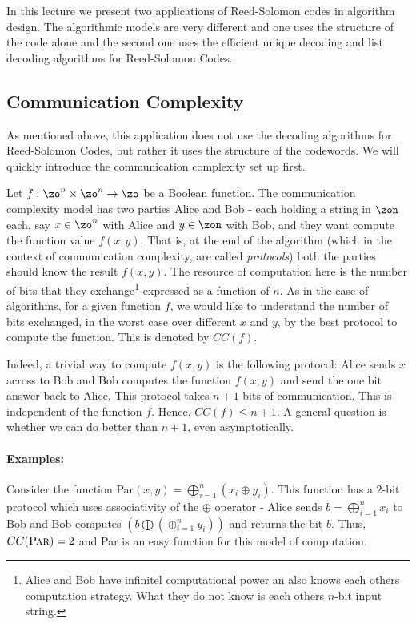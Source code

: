 In this lecture we present two applications of Reed-Solomon codes in algorithm design. The algorithmic models are very different and one uses the structure of the code alone and the second one uses the efficient unique decoding and list decoding algorithms for Reed-Solomon Codes.

\subsection{Communication Complexity}
As mentioned above, this application does not use the decoding algorithms for Reed-Solomon Codes, but rather it uses the  structure of the codewords. We will quickly introduce the communication complexity set up first.

Let $f : \zo^n \times \zo^n \to \zo$ be a Boolean function. The communication complexity model has two parties Alice and Bob - each holding a string in $\zon$ each, say $x \in \zo^n$ with Alice and $y \in \zon$ with Bob, and they want compute the function value $f(x,y)$. That is, at the end of the algorithm (which in the context of communication complexity, are called {\em protocols}) both the parties should know the result $f(x,y)$. The resource of computation here is the number of bits that they exchange\footnote{Alice and Bob have infinitel computational power an also knows each others computation strategy. What they do not know is each others $n$-bit input string.} expressed as a function of $n$. As in the case of algorithms, for a given function $f$, we would like to understand the number of bits exchanged, in the worst case over different $x$ and $y$, by the best protocol to compute the function. This is denoted by $CC(f)$.

Indeed, a trivial way to compute $f(x,y)$ is the following protocol: Alice sends $x$ across to Bob and Bob computes the function $f(x,y)$ and send the one bit answer back to Alice. This protocol takes $n+1$ bits of communication. This is independent of the function $f$. Hence, $CC(f) \le n+1$. A general question is whether we can do better than $n+1$, even asymptotically. \\[-10mm]

\paragraph{Examples:} 
Consider the function {\sc Par}$(x,y) = \bigoplus_{i=1}^n(x_i \oplus y_i)$. This function has a $2$-bit protocol which uses associativity of the $\oplus$ operator - Alice sends $b = \bigoplus_{i=1}^n x_i$ to Bob and Bob computes $\left( b \bigoplus \left( \oplus_{i=1}^n y_i \right) \right) $ and returns the bit $b$. Thus, $CC(\textrm{\sc Par}) = 2$ and {\sc Par} is an easy function for this model of computation.

